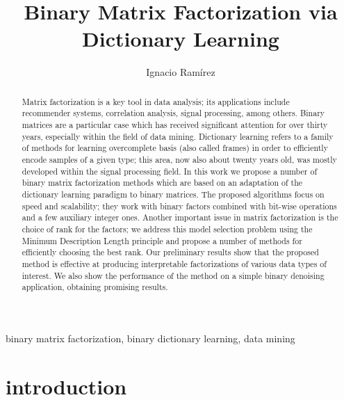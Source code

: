 \documentclass[twocolumn]{IEEEtran}
\title{Binary Matrix Factorization via Dictionary Learning}\author{Ignacio Ram\'{i}rez}
\begin{document}
%
\maketitle
%
\begin{abstract}
Matrix factorization is a key tool in data analysis; its applications include recommender systems, correlation analysis, signal processing, among others. Binary matrices are a particular case which has received significant attention for over thirty years, especially within the field of data mining. Dictionary learning refers to a family of methods for learning overcomplete basis (also called frames) in order to efficiently encode samples of a given type; this area, now also about twenty years old, was mostly developed within the signal processing field.
In this work we propose a number of binary matrix factorization methods which are based on an adaptation of the dictionary learning paradigm to binary matrices.
The proposed algorithms focus on speed and scalability; they work with binary factors combined with bit-wise operations and a few auxiliary integer ones.
Another important issue in matrix factorization is the choice of rank for the factors; we address this model selection problem using the Minimum Description Length principle and propose a number of methods for efficiently choosing the best rank.
Our preliminary results show that the proposed method is effective at producing interpretable factorizations of various data types of interest. We also show the performance of the method on a simple binary denoising application, obtaining promising results.
\end{abstract}%
\begin{IEEEkeywords}
binary matrix factorization, binary dictionary learning, data mining
\end{IEEEkeywords}
%
\section{introduction}
\end{document}
